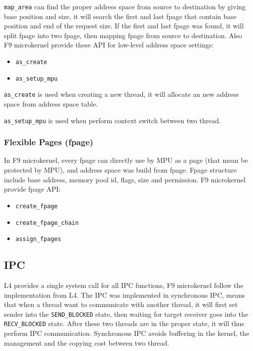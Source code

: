 \documentclass[10pt,preprint,nocopyrightspace]{sigplanconf}
\begin{document}
\verb|map_area| can find the proper address space from source to destination by giving base position and size, it will search the first and last fpage that contain base position and end of the request size. If the first and last fpage was found, it will split fpage into two fpage, then mapping fpage from source to destination. Also F9 microkernel provide these API for low-level address space settings: 
\begin{itemize}
\item \verb|as_create|
\item \verb|as_setup_mpu|
\end{itemize}

\verb|as_create| is used when creating a new thread, it will allocate an new address space from address space table.

\verb|as_setup_mpu| is used when perform context switch between two thread.


\subsubsection{Flexible Pages (fpage)}
In F9 microkernel, every fpage can directly use by MPU as a page (that mean be protected by MPU), and address space was build from fpage. Fpage structure include base address, memory pool id, flags, size and permission. F9 microkernel provide fpage API:
\begin{itemize}
	\item \verb|create_fpage|
	\item \verb|create_fpage_chain|
	\item \verb|assign_fpages|
\end{itemize}

\subsection{IPC}

L4 provides a single system call for all IPC functions, F9 microkernel follow the implementation from L4\cite{dannowski2011l4}. The IPC was implemented in synchronous IPC, means that when a thread want to communicate with another thread, it will first set sender into the \verb|SEND_BLOCKED| state, then waiting for target receiver goes into the \verb|RECV_BLOCKED| state. After these two threads are in the proper state, it will thus perform IPC communication. Synchronous IPC avoids buffering in the kernel, the management and the copying cost between two thread.\cite{nourai2005aphysically}
\end{document}
